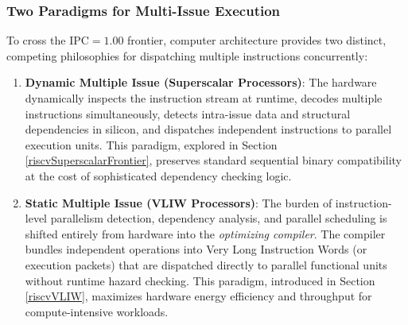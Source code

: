 \subsubsection{Two Paradigms for Multi-Issue Execution}
To cross the $\text{IPC} = 1.00$ frontier, computer architecture provides two distinct, competing philosophies for dispatching multiple instructions concurrently:
\begin{enumerate}
    \item \textbf{Dynamic Multiple Issue (Superscalar Processors)}:
    The hardware dynamically inspects the instruction stream at runtime, decodes multiple instructions simultaneously, detects intra-issue data and structural dependencies in silicon, and dispatches independent instructions to parallel execution units. This paradigm, explored in Section \ref{riscvSuperscalarFrontier}, preserves standard sequential binary compatibility at the cost of sophisticated dependency checking logic.
    \item \textbf{Static Multiple Issue (VLIW Processors)}:
    The burden of instruction-level parallelism detection, dependency analysis, and parallel scheduling is shifted entirely from hardware into the \textit{optimizing compiler}. The compiler bundles independent operations into Very Long Instruction Words (or execution packets) that are dispatched directly to parallel functional units without runtime hazard checking. This paradigm, introduced in Section \ref{riscvVLIW}, maximizes hardware energy efficiency and throughput for compute-intensive workloads.
\end{enumerate}